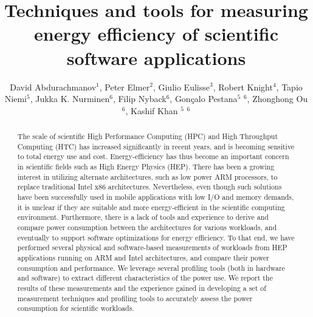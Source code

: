 \documentclass[a4paper]{jpconf}
\begin{document}

\title{Techniques and tools for measuring energy efficiency of scientific software applications}

\author{David Abdurachmanov$^1$, Peter Elmer$^2$, Giulio Eulisse$^3$, Robert Knight$^4$, Tapio Niemi$^5$, Jukka K. Nurminen$^6$, Filip Nyback$^6$, Gon\c{c}alo Pestana$^5$ $^6$, Zhonghong Ou$^6$, Kashif Khan $^5$ $^6$}

\address{$^1$ Digital Science and Computing Center, Faculty of Mathematics and Informatics, Vilnius University, Vilnius, Lithuania}
\address{$^2$ Department of Physics, Princeton University, Princeton, NJ 08540, USA}
\address{$^3$ Fermilab, Batavia, IL 60510, USA}
\address{$^4$ Research Computing, Office of Information Technology, Princeton University, Princeton, New Jersey 08540, USA}
\address{$^5$ Helsinki Institute of Physics, PO Box 64, FI-00014, Helsinki, Finland }
\address{$^6$ Aalto University, PO Box 11100, 00076 Aalto, Finland}





\begin{abstract}
The scale of scientific High Performance Computing (HPC) and High 
Throughput Computing (HTC) has increased significantly in recent years,
and is becoming sensitive to total energy use and cost.
Energy-efficiency
has thus become an important concern in scientific fields such as High
Energy Physics (HEP). There has been a growing interest in utilizing
alternate architectures, such as low power ARM processors, to replace 
traditional
Intel x86 architectures. Nevertheless, even though such solutions
have been successfully used in mobile applications with low I/O and
memory demands, it is unclear if they are suitable and more
energy-efficient in the scientific computing environment. Furthermore,
there is a lack of tools and experience to derive and compare power 
consumption between the architectures for various workloads, and 
eventually to support software optimizations for energy efficiency.
To that end, we have performed several physical and software-based
measurements of workloads from HEP applications running on ARM and Intel
architectures, and compare their power consumption and performance.
We leverage several profiling tools (both in hardware and software)
to extract different characteristics of the power use. 
We report the results of these measurements and
the experience gained in developing a set of measurement techniques
and profiling tools to accurately assess the power consumption for
scientific workloads. 
\end{abstract}
\end{document}
